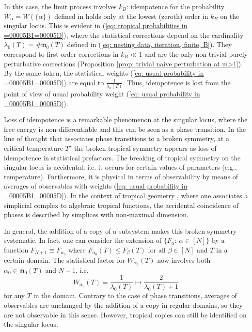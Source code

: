\documentclass[11pt,british,reqno]{article}
\numberwithin{equation}{section}
\numberwithin{figure}{section}
\numberwithin{table}{section}
\theoremstyle{definition}
\theoremstyle{definition}
\theoremstyle{plain}
\theoremstyle{plain}
\theoremstyle{remark}
\theoremstyle{plain}
\numberwithin{equation}{section}
\numberwithin{figure}{section}
\numberwithin{table}{section}
\theoremstyle{plain}
\begin{document}
In this case, the limit process involves $k_{B}$: idempotence for the 
probability $W_{\alpha}=W(\{\alpha\})$ defined in \cite{AK2015}
holds only at the lowest (zeroth) order in $k_{B}$ on the singular locus. This is evident in (\ref{eq: tropical probabilities in =00005B1=00005D}), where the statistical corrections depend on the cardinality $\lambda_{0}(T)=\#\mathfrak{m}_{0}(T)$
defined in (\ref{eq: nesting data, iteration, finite, B}). They correspond to first order corrections in $k_{B}\ll1$ and are the only non-trivial purely perturbative corrections (Proposition \ref{prop: trivial naive perturbation at m>1}).
By the same token, the statistical weights (\ref{eq: usual probability in =00005B1=00005D})
are equal to ${\displaystyle \frac{1}{\lambda_{0}(T)}}$. Thus, idempotence
is lost from the point of view of usual probability weight (\ref{eq: usual probability in =00005B1=00005D}). 

Loss of idempotence is a remarkable phenomenon at the singular locus,
where the free energy is non-differentiable and this can be seen as a
phase transition. In the line of thought that associates phase transitions to a broken symmetry, at a critical temperature $T^{\star}$ the broken tropical symmetry appears as loss of idempotence in statistical prefactors.
The breaking of tropical symmetry on the singular locus is accidental,
i.e. it occurs for certain values of parameters (e.g., temperature).
Furthermore, it is physical in terms of observability by means of
averages of observables with weights (\ref{eq: usual probability in =00005B1=00005D}). In the context of tropical geometry \cite{MS2015}, where one associates a simplicial complex to algebraic tropical functions, the accidental coincidence of phases is described by simplices with non-maximal dimension. 

In general, the addition of a copy of a subsystem makes this broken
symmetry systematic. In fact, one can consider the extension of $\{F_{\alpha}:\,\alpha\in[N]\}$ by a function $F_{N+1}\equiv F_{\alpha_{0}}$ where $F_{\alpha_{0}}(T)\leq F_{\beta}(T)$ for all $\beta\in[N]$ and $T$ in a certain domain. The statistical factor for $W_{\alpha_{0}}(T)$ now involves both $\alpha_{0}\in\mathfrak{m}_{0}(T)$ and $N+1$, i.e.  
\begin{equation}
W_{\alpha_{0}}(T)=\frac{1}{\lambda_{0}(T)}\mapsto\frac{2}{\lambda_{0}(T)+1}\label{eq: usual probability effect copying}
\end{equation}
for any $T$ in the domain. Contrary to the case of phase transitions, averages of observables are unchanged by the addition of a copy in regular domains, so they are not observable in this sense. However, tropical copies can still be identified on the singular locus.  
\end{document}
